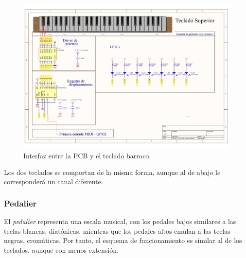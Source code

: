 \begin{figure}[H]
	\noindent \begin{centering}
		\includegraphics[width=\linewidth*2/3]{capitulo3/pcb_teclado}
		\par\end{centering}
	\smallskip
	\caption{\label{fig:pcb_teclado} Interfaz entre la \acrshort{PCB} y el teclado barroco.}
\end{figure} 

\smallskip

Los dos teclados se comportan de la misma forma, aunque al de abajo le corresponderá un canal diferente.

\subsubsection{Pedalier}

El \textit{pedalier} representa una escala musical, con los pedales bajos similares a las teclas blancas, diatónicas, mientras que los pedales altos emulan a las teclas negras, cromáticas. Por tanto, el esquema de funcionamiento es similar al de los teclados, aunque con menos extensión.

\smallskip

